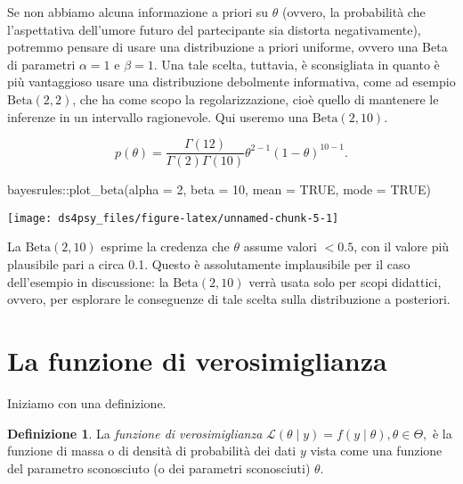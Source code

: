 \documentclass[
]{book}
\newenvironment{Shaded}{\begin{snugshade}}{\end{snugshade}}
\newcommand{\AttributeTok}[1]{\textcolor[rgb]{0.77,0.63,0.00}{#1}}
\newcommand{\ConstantTok}[1]{\textcolor[rgb]{0.00,0.00,0.00}{#1}}
\newcommand{\DecValTok}[1]{\textcolor[rgb]{0.00,0.00,0.81}{#1}}
\newcommand{\FunctionTok}[1]{\textcolor[rgb]{0.00,0.00,0.00}{#1}}
\newcommand{\NormalTok}[1]{#1}
\newcommand{\SpecialCharTok}[1]{\textcolor[rgb]{0.00,0.00,0.00}{#1}}
\theoremstyle{definition}
\newtheorem{definition}{Definizione}
\theoremstyle{definition}
\theoremstyle{definition}
\theoremstyle{definition}
\theoremstyle{remark}
\begin{document}
Se non abbiamo alcuna informazione a priori su \(\theta\) (ovvero, la probabilità che l'aspettativa dell'umore futuro del partecipante sia distorta negativamente), potremmo pensare di usare una distribuzione a priori uniforme, ovvero una Beta di parametri \(\alpha=1\) e \(\beta=1\). Una tale scelta, tuttavia, è sconsigliata in quanto è più vantaggioso usare una distribuzione debolmente informativa, come ad esempio \(\mbox{Beta}(2, 2)\), che ha come scopo la regolarizzazione, cioè quello di mantenere le inferenze in un intervallo ragionevole. Qui useremo una \(\mbox{Beta}(2, 10)\).

\[
p(\theta) = \frac{\Gamma(12)}{\Gamma(2)\Gamma(10)}\theta^{2-1} (1-\theta)^{10-1}.
\]

\begin{Shaded}
\begin{Highlighting}[]
\NormalTok{bayesrules}\SpecialCharTok{::}\FunctionTok{plot\_beta}\NormalTok{(}\AttributeTok{alpha =} \DecValTok{2}\NormalTok{, }\AttributeTok{beta =} \DecValTok{10}\NormalTok{, }\AttributeTok{mean =} \ConstantTok{TRUE}\NormalTok{, }\AttributeTok{mode =} \ConstantTok{TRUE}\NormalTok{)}
\end{Highlighting}
\end{Shaded}

\begin{center}\texttt{[image: ds4psy\_files/figure-latex/unnamed-chunk-5-1]} \end{center}

La \(\mbox{Beta}(2, 10)\) esprime la credenza che \(\theta\) assume valori \(< 0.5\), con il valore più plausibile pari a circa 0.1. Questo è assolutamente implausibile per il caso dell'esempio in discussione: la \(\mbox{Beta}(2, 10)\) verrà usata solo per scopi didattici, ovvero, per esplorare le conseguenze di tale scelta sulla distribuzione a posteriori.

\hypertarget{la-funzione-di-verosimiglianza}{%
\section{La funzione di verosimiglianza}\label{la-funzione-di-verosimiglianza}}

Iniziamo con una definizione.

\begin{definition}
La \emph{funzione di verosimiglianza} \(\mathcal{L}(\theta \mid y) = f(y \mid \theta), \theta \in \Theta,\) è la funzione di massa o di densità di probabilità dei dati \(y\) vista come una funzione del parametro sconosciuto (o dei parametri sconosciuti) \(\theta\).
\end{definition}
\end{document}
